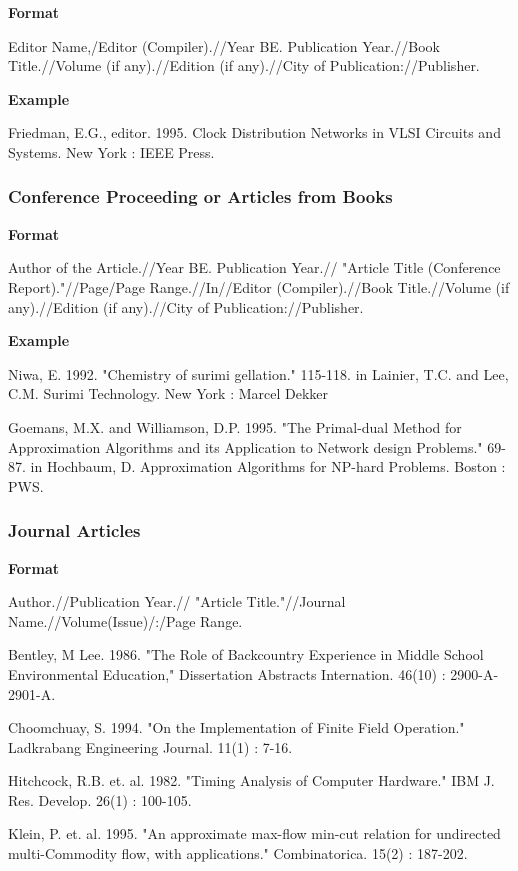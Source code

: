 \textbf{Format}

Editor Name,/Editor (Compiler).//Year BE. Publication Year.//Book Title.//Volume (if any).//Edition (if any).//City of Publication://Publisher.

\textbf{Example}

Friedman, E.G., editor. 1995. Clock Distribution Networks in VLSI Circuits and Systems. New York : IEEE Press.

\subsubsection{Conference Proceeding or Articles from Books}

\textbf{Format}

Author of the Article.//Year BE. Publication Year.// "Article Title (Conference Report)."//Page/Page Range.//In//Editor (Compiler).//Book Title.//Volume (if any).//Edition (if any).//City of Publication://Publisher.

\textbf{Example}

Niwa, E. 1992. "Chemistry of surimi gellation." 115-118. in Lainier, T.C. and Lee, C.M. Surimi Technology. New York : Marcel Dekker

Goemans, M.X. and Williamson, D.P. 1995. "The Primal-dual Method for Approximation Algorithms and its Application to Network design Problems." 69-87. in Hochbaum, D. Approximation Algorithms for NP-hard Problems. Boston : PWS.

\subsubsection{Journal Articles}

\textbf{Format}

Author.//Publication Year.// "Article Title."//Journal Name.//Volume(Issue)/:/Page Range.

Bentley, M Lee. 1986. "The Role of Backcountry Experience in Middle School Environmental Education," Dissertation Abstracts Internation. 46(10) : 2900-A-2901-A.

Choomchuay, S. 1994. "On the Implementation of Finite Field Operation." Ladkrabang Engineering Journal. 11(1) : 7-16.

Hitchcock, R.B. et. al. 1982. "Timing Analysis of Computer Hardware." IBM J. Res. Develop. 26(1) : 100-105.

Klein, P. et. al. 1995. "An approximate max-flow min-cut relation for undirected multi-Commodity flow, with applications." Combinatorica. 15(2) : 187-202.

